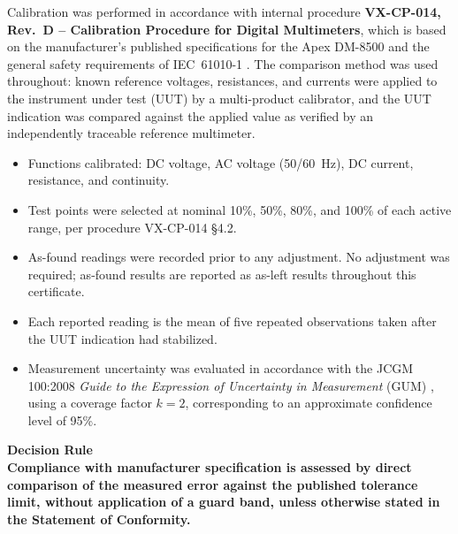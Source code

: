 
Calibration was performed in accordance with internal procedure \textbf{VX-CP-014, Rev.\ D
-- Calibration Procedure for Digital Multimeters}, which is based on the manufacturer's
published specifications for the Apex DM-8500 and the general safety requirements of
IEC~61010-1 \cite{iec61010}. The comparison method was used throughout: known reference
voltages, resistances, and currents were applied to the instrument under test (UUT) by a
multi-product calibrator, and the UUT indication was compared against the applied value as
verified by an independently traceable reference multimeter.

\begin{itemize}[leftmargin=1.4em,itemsep=2pt]
  \item Functions calibrated: DC voltage, AC voltage (50/60~Hz), DC current, resistance,
        and continuity.
  \item Test points were selected at nominal 10\%, 50\%, 80\%, and 100\% of each active
        range, per procedure VX-CP-014 \S4.2.
  \item As-found readings were recorded prior to any adjustment. No adjustment was
        required; as-found results are reported as as-left results throughout this
        certificate.
  \item Each reported reading is the mean of five repeated observations taken after the
        UUT indication had stabilized.
  \item Measurement uncertainty was evaluated in accordance with the JCGM 100:2008
        \emph{Guide to the Expression of Uncertainty in Measurement} (GUM) \cite{gum2008},
        using a coverage factor $k=2$, corresponding to an approximate confidence level
        of 95\%.
\end{itemize}

\vspace{2pt}
\begin{tcolorbox}[statementbox]
  \small\sffamily\bfseries\color{certnavy} Decision Rule \normalfont\normalsize\sffamily\color{black}\\[2pt]
  \small Compliance with manufacturer specification is assessed by direct comparison of
  the measured error against the published tolerance limit, without application of a
  guard band, unless otherwise stated in the Statement of Conformity.
\end{tcolorbox}
